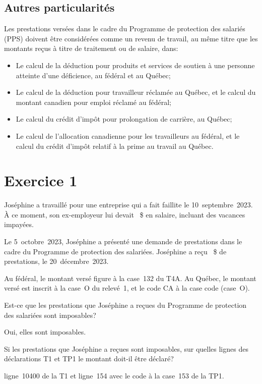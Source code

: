 \subsection{Autres particularités}
Les prestations versées dans le cadre du Programme de protection des salariés (PPS) doivent être considérées comme un revenu de travail, au même titre que les montants reçus à titre de traitement ou de salaire, dans:
\begin{itemize}
	\item Le calcul de la déduction pour produits et services de soutien à une personne atteinte d'une déficience, au fédéral et au Québec;
	\item Le calcul de la déduction pour travailleur réclamée au Québec, et le calcul du montant canadien pour emploi réclamé au fédéral;
	\item Le calcul du crédit d'impôt pour prolongation de carrière, au Québec;
	\item Le calcul de l'allocation canadienne pour les travailleurs au fédéral, et le calcul du crédit d'impôt relatif à la prime au travail au Québec.
\end{itemize}


\section{Exercice 1}
\setcounter{question}{0}
\begin{question}
	Joséphine a travaillé pour une entreprise qui a fait faillite le 10~septembre~2023. À ce moment, son ex-employeur lui devait ~\$ en salaire, incluant des vacances impayées. 
	
	Le 5~octobre~2023, Joséphine a présenté une demande de prestations dans le cadre du Programme de protection des salariées. Joséphine a reçu ~\$ de prestations, le 20~décembre~2023.
	
	Au fédéral, le montant versé figure à la case~132 du T4A. Au Québec, le montant versé est inscrit à la case~O du relevé~1, et le code \og CA \fg{} à la case code (case~O).
\end{question}
\setcounter{sousQuestion}{0}
\begin{sousQuestion}
	Est-ce que les prestations que Joséphine a reçues du Programme de protection des salariées sont imposables?
\end{sousQuestion}
Oui, elles sont imposables.

\begin{sousQuestion}
	Si les prestations que Joséphine a reçues sont imposables, sur quelles lignes des déclarations T1 et TP1 le montant doit-il être déclaré?
\end{sousQuestion}
ligne~10400 de la T1 et ligne~154 avec le code  \fg{} à la case~153 de la TP1.

